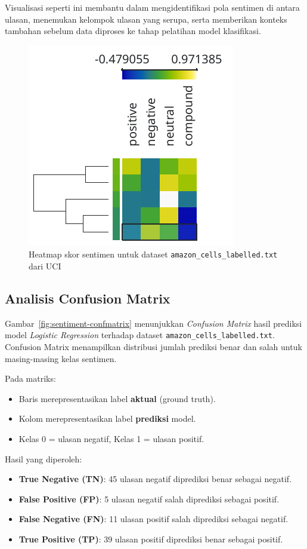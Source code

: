 Visualisasi seperti ini membantu dalam mengidentifikasi pola sentimen di antara ulasan, menemukan kelompok ulasan yang serupa, serta memberikan konteks tambahan sebelum data diproses ke tahap pelatihan model klasifikasi.

\begin{figure}[h]
	\centering
	\includegraphics[width=0.5\linewidth]{../figures/sentiment_heatmap.png}
	\caption{Heatmap skor sentimen untuk dataset \texttt{amazon\_cells\_labelled.txt} dari UCI}
	\label{fig:sentiment-heatmap}
\end{figure}

\subsection*{Analisis Confusion Matrix}

Gambar~\ref{fig:sentiment-confmatrix} menunjukkan \textit{Confusion Matrix} hasil prediksi model \textit{Logistic Regression} terhadap dataset \texttt{amazon\_cells\_labelled.txt}. Confusion Matrix menampilkan distribusi jumlah prediksi benar dan salah untuk masing-masing kelas sentimen.

Pada matriks:
\begin{itemize}
	\item Baris merepresentasikan label \textbf{aktual} (ground truth).
	\item Kolom merepresentasikan label \textbf{prediksi} model.
	\item Kelas 0 = ulasan negatif, Kelas 1 = ulasan positif.
\end{itemize}

Hasil yang diperoleh:
\begin{itemize}
	\item \textbf{True Negative (TN)}: 45 ulasan negatif diprediksi benar sebagai negatif.
	\item \textbf{False Positive (FP)}: 5 ulasan negatif salah diprediksi sebagai positif.
	\item \textbf{False Negative (FN)}: 11 ulasan positif salah diprediksi sebagai negatif.
	\item \textbf{True Positive (TP)}: 39 ulasan positif diprediksi benar sebagai positif.
\end{itemize}

